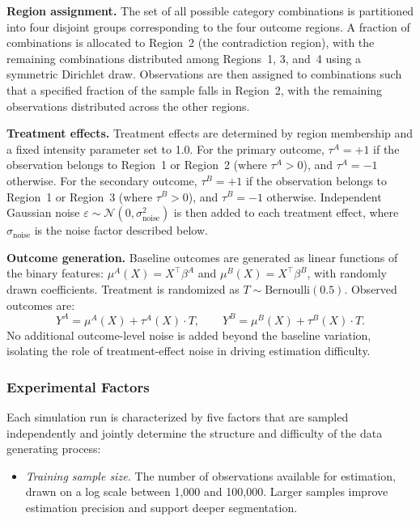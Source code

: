 \documentclass[11pt,letterpaper,english]{article}
\theoremstyle{definition}
\theoremstyle{definition}
\begin{document}
\begin{bibunit}
\vspace{6pt}
\noindent
\textbf{Region assignment.}
The set of all possible category combinations is partitioned into four disjoint groups corresponding to the four outcome regions. A fraction of combinations is allocated to Region~2 (the contradiction region), with the remaining combinations distributed among Regions~1, 3, and~4 using a symmetric Dirichlet draw. Observations are then assigned to combinations such that a specified fraction of the sample falls in Region~2, with the remaining observations distributed across the other regions.

\vspace{6pt}
\noindent
\textbf{Treatment effects.}
Treatment effects are determined by region membership and a fixed intensity parameter set to 1.0. For the primary outcome, $\tau^A = +1$ if the observation belongs to Region~1 or Region~2 (where $\tau^A > 0$), and $\tau^A = -1$ otherwise. For the secondary outcome, $\tau^B = +1$ if the observation belongs to Region~1 or Region~3 (where $\tau^B > 0$), and $\tau^B = -1$ otherwise. Independent Gaussian noise $\varepsilon \sim \mathcal{N}(0, \sigma_{\text{noise}}^2)$ is then added to each treatment effect, where $\sigma_{\text{noise}}$ is the noise factor described below.

\vspace{6pt}
\noindent
\textbf{Outcome generation.}
Baseline outcomes are generated as linear functions of the binary features: $\mu^A(X) = X^\top \beta^A$ and $\mu^B(X) = X^\top \beta^B$, with randomly drawn coefficients. Treatment is randomized as $T \sim \text{Bernoulli}(0.5)$. Observed outcomes are:
\[
Y^A = \mu^A(X) + \tau^A(X) \cdot T, \qquad
Y^B = \mu^B(X) + \tau^B(X) \cdot T.
\]
No additional outcome-level noise is added beyond the baseline variation, isolating the role of treatment-effect noise in driving estimation difficulty.

\subsubsection{Experimental Factors}
\label{sec:factors}

Each simulation run is characterized by five factors that are sampled independently and jointly determine the structure and difficulty of the data generating process:

\begin{itemize}[leftmargin=2em]
    \item \emph{Training sample size.}
    The number of observations available for estimation, drawn on a log scale between 1{,}000 and 100{,}000. Larger samples improve estimation precision and support deeper segmentation.


\end{itemize}
\end{bibunit}
\end{document}
